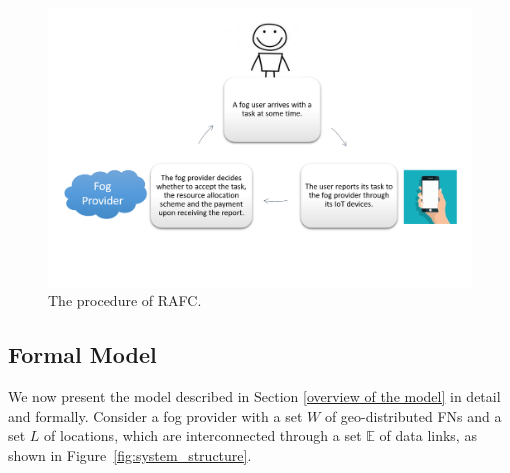 \documentclass[11pt]{phdthesis}
\begin{document}
\begin{figure}
    \centering
    \includegraphics[width=1\textwidth]{./Figures/Allocation_procedure.png}
    \caption{\label{fig: procedure} The procedure of RAFC.}
\end{figure}

\subsection{Formal Model} \label{formal model}

We now present the model described in Section \ref{overview of the model} in detail and formally. Consider a fog provider with a set $W$ of geo-distributed FNs and a set $L$ of locations, which are interconnected through a set $\mathbb{E}$ of data links, as shown in Figure~\ref{fig:system_structure}. 
\end{document}
